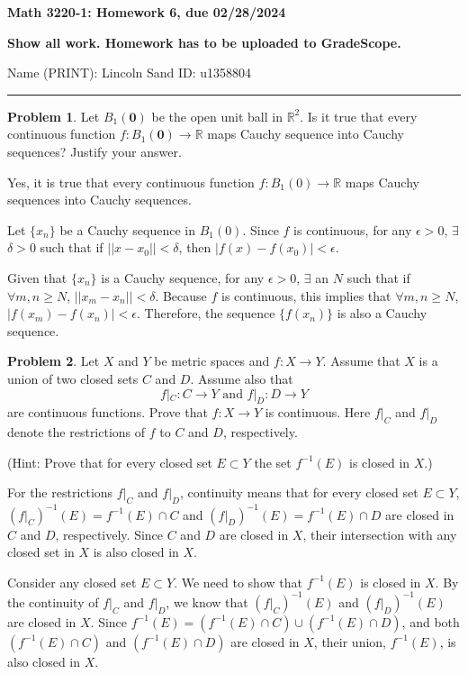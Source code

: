 \documentclass[12]{amsart}
\theoremstyle{definition}
\newtheorem{xca}{Problem}
\newcommand{\R}{\mathbb{R}}
\newcommand{\sskip}{\newpage}
\begin{document}
\centerline{ \bf Math 3220-1: Homework 6, due 02/28/2024}
\bigskip
\centerline{ \bf Show all work. Homework has to be uploaded to GradeScope.}
\bigskip
\noindent Name (PRINT): Lincoln Sand\hskip 2.5in ID: u1358804
\smallskip

\hrule

\bigskip
\begin{xca}
Let $B_1(\textbf{0})$ be the open unit ball in $\R^2$. Is it true that every continuous function $f:B_1(\textbf{0})\to\R$ maps Cauchy sequence into Cauchy sequences? Justify your answer.
\end{xca}

Yes, it is true that every continuous function $f : B_1(0) \to \R$ maps
Cauchy sequences into Cauchy sequences.

Let $\{x_n\}$ be a Cauchy sequence in $B_1(0)$. Since $f$ is continuous,
for any $\epsilon > 0$, $\exists$ $\delta > 0$ such that if $||x - x_0|| < \delta$,
then $|f(x) - f(x_0)| < \epsilon$.

Given that $\{x_n\}$ is a Cauchy sequence, for any $\epsilon > 0$,
$\exists$ an $N$ such that if $\forall m, n \geq N$, $||x_m - x_n|| < \delta$.
Because $f$ is continuous, this implies that $\forall m, n \geq N$,
$|f(x_m) - f(x_n)| < \epsilon$. Therefore, the sequence $\{f(x_n)\}$
is also a Cauchy sequence.

\sskip


\begin{xca} %
Let $X$ and $Y$ be metric spaces and $f:X\to Y$. Assume that $X$ is a union of two closed sets $C$ and $D$. Assume also that
$$
f|_{C}:C\to Y \text{ and } f|_{D}:D\to Y
$$
are continuous functions. Prove that $f:X\to Y$ is continuous. Here $f|_{C}$ and $f|_{D}$ denote the restrictions of $f$ to $C$ and $D$, respectively.

\noindent (Hint: Prove that for every closed set $E\subset Y$ the set $f^{-1}(E)$ is closed in $X$.)
\end{xca}

For the restrictions $f|_{C}$ and $f|_{D}$, continuity means that for every closed set
$E \subset Y$, $(f|_{C})^{-1}(E) = f^{-1}(E) \cap C$ and
$(f|_{D})^{-1}(E) = f^{-1}(E) \cap D$ are closed in $C$ and $D$, respectively.
Since $C$ and $D$ are closed in $X$, their intersection with any closed set in $X$
is also closed in $X$.

Consider any closed set $E \subset Y$. We need to show that $f^{-1}(E)$
is closed in $X$. By the continuity of $f|_{C}$ and $f|_{D}$,
we know that $(f|_{C})^{-1}(E)$ and $(f|_{D})^{-1}(E)$ are closed in $X$.
Since $f^{-1}(E) = (f^{-1}(E) \cap C) \cup (f^{-1}(E) \cap D)$,
and both $(f^{-1}(E) \cap C)$ and $(f^{-1}(E) \cap D)$ are closed in $X$,
their union, $f^{-1}(E)$, is also closed in $X$.
\end{document}
